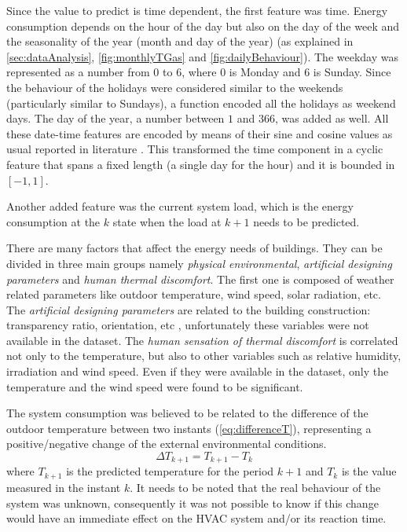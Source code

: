 \documentclass{sig-alternate-sigmod07}
\begin{document}
Since the value to predict is time dependent, the first feature was time. Energy consumption depends on the hour of the day but also on the day of the week and the seasonality of the year (month and day of the year) (as explained in \cref{sec:dataAnalysis}, \cref{fig:monthlyTGas} and \cref{fig:dailyBehaviour}). The weekday was represented as a number from $0$ to $6$, where $0$ is Monday and 6 is Sunday. Since the behaviour of the holidays were considered similar to the weekends (particularly similar to Sundays), a function encoded all the holidays as weekend days. The day of the year, a number between $1$ and $366$, was added as well. All these date-time features are encoded by means of their sine and cosine values as usual reported in literature \cite{ohlsson1994predicting, dodier2004statistical, gonzalez2005prediction}. This transformed the time component in a cyclic feature that spans a fixed length (a single day for the hour) and it is bounded in $[-1,1]$.

Another added feature was the current system load, which is the energy consumption at the $k$ state when the load at $k+1$ needs to be predicted.

There are many factors that affect the energy needs of buildings. They can be divided in three main groups namely \emph{physical environmental}, \emph{artificial designing parameters} and \emph{human thermal discomfort}. The first one is composed of weather related parameters like outdoor temperature, wind speed, solar radiation, etc. The \emph{artificial designing parameters} are related to the building construction: transparency ratio, orientation, etc \cite{ekici2009prediction}, unfortunately these variables were not available in the dataset. The \emph{human sensation of thermal discomfort} is correlated not only to the temperature, but also to other variables such as relative humidity, irradiation and wind speed. Even if they were available in the dataset, only the temperature and the wind speed were found to be significant.

The system consumption was believed to be related to the difference of the outdoor temperature between two instants (\cref{eq:differenceT}), representing a positive/negative change of the external environmental conditions.
\begin{equation}\Delta T_{k+1}=T_{k+1} - T_{k}\label{eq:differenceT}\end{equation} where $T_{k+1}$ is the predicted temperature for the period $k+1$ and $T_k$ is the value measured in the instant $k$. It needs to be noted that the real behaviour of the system was unknown, consequently it was not possible to know if this change would have an immediate effect on the HVAC system and/or its reaction time.
\end{document}
